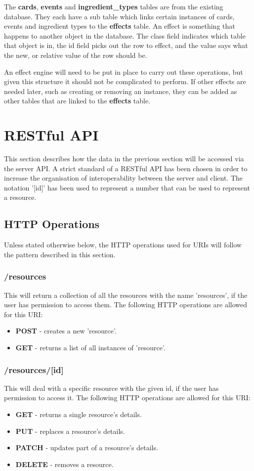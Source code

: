 The \textbf{cards}, \textbf{events} and \textbf{ingredient\_types} tables are from the existing database. They each have a sub table which links certain instances of cards, events and ingredient types to the \textbf{effects} table. An effect is something that happens to another object in the database. The class field indicates which table that object is in, the id field picks out the row to effect, and the value says what the new, or relative value of the row should be.

An effect engine will need to be put in place to carry out these operations, but given this structure it should not be complicated to perform. If other effects are needed later, such as creating or removing an instance, they can be added as other tables that are linked to the \textbf{effects} table.

\section{RESTful API}
This section describes how the data in the previous section will be accessed via the server API. A strict standard of a RESTful API has been chosen in order to increase the organisation of interoperability between the server and client. The notation '[id]' has been used to represent a number that can be used to represent a resource.

\subsection{HTTP Operations}
Unless stated otherwise below, the HTTP operations used for URIs will follow the pattern described in this section.
\subsubsection{/resources}
This will return a collection of all the resources with the name 'resources', if the user has permission to access them. The following HTTP operations are allowed for this URI:
\begin{itemize}
	\item \textbf{POST} - creates a new 'resource'.
	\item \textbf{GET} - returns a list of all instances of 'resource'.
\end{itemize}
\subsubsection{/resources/[id]}
This will deal with a specific resource with the given id, if the user has permission to access it. The following HTTP operations are allowed for this URI:
\begin{itemize}
	\item \textbf{GET} - returns a single resource's details.
	\item \textbf{PUT} - replaces a resource's details.
	\item \textbf{PATCH} - updates part of a resource's details.
	\item \textbf{DELETE} - removes a resource.
\end{itemize}
